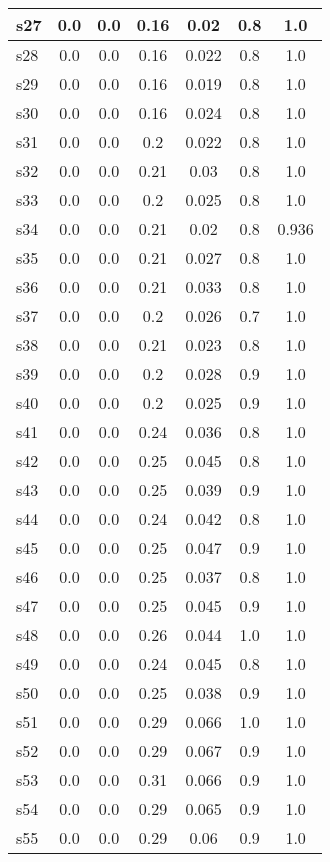 \documentclass{article}
\begin{document}
\begin{tabular}{|l|c|c|c|c|c|c|}
\hline
s27 &0.0 & 0.0 & 0.16 & 0.02 & 0.8 & 1.0\\
\hline
s28 &0.0 & 0.0 & 0.16 & 0.022 & 0.8 & 1.0\\
\hline
s29 &0.0 & 0.0 & 0.16 & 0.019 & 0.8 & 1.0\\
\hline
s30 &0.0 & 0.0 & 0.16 & 0.024 & 0.8 & 1.0\\
\hline
s31 &0.0 & 0.0 & 0.2 & 0.022 & 0.8 & 1.0\\
\hline
s32 &0.0 & 0.0 & 0.21 & 0.03 & 0.8 & 1.0\\
\hline
s33 &0.0 & 0.0 & 0.2 & 0.025 & 0.8 & 1.0\\
\hline
s34 &0.0 & 0.0 & 0.21 & 0.02 & 0.8 & 0.936\\
\hline
s35 &0.0 & 0.0 & 0.21 & 0.027 & 0.8 & 1.0\\
\hline
s36 &0.0 & 0.0 & 0.21 & 0.033 & 0.8 & 1.0\\
\hline
s37 &0.0 & 0.0 & 0.2 & 0.026 & 0.7 & 1.0\\
\hline
s38 &0.0 & 0.0 & 0.21 & 0.023 & 0.8 & 1.0\\
\hline
s39 &0.0 & 0.0 & 0.2 & 0.028 & 0.9 & 1.0\\
\hline
s40 &0.0 & 0.0 & 0.2 & 0.025 & 0.9 & 1.0\\
\hline
s41 &0.0 & 0.0 & 0.24 & 0.036 & 0.8 & 1.0\\
\hline
s42 &0.0 & 0.0 & 0.25 & 0.045 & 0.8 & 1.0\\
\hline
s43 &0.0 & 0.0 & 0.25 & 0.039 & 0.9 & 1.0\\
\hline
s44 &0.0 & 0.0 & 0.24 & 0.042 & 0.8 & 1.0\\
\hline
s45 &0.0 & 0.0 & 0.25 & 0.047 & 0.9 & 1.0\\
\hline
s46 &0.0 & 0.0 & 0.25 & 0.037 & 0.8 & 1.0\\
\hline
s47 &0.0 & 0.0 & 0.25 & 0.045 & 0.9 & 1.0\\
\hline
s48 &0.0 & 0.0 & 0.26 & 0.044 & 1.0 & 1.0\\
\hline
s49 &0.0 & 0.0 & 0.24 & 0.045 & 0.8 & 1.0\\
\hline
s50 &0.0 & 0.0 & 0.25 & 0.038 & 0.9 & 1.0\\
\hline
s51 &0.0 & 0.0 & 0.29 & 0.066 & 1.0 & 1.0\\
\hline
s52 &0.0 & 0.0 & 0.29 & 0.067 & 0.9 & 1.0\\
\hline
s53 &0.0 & 0.0 & 0.31 & 0.066 & 0.9 & 1.0\\
\hline
s54 &0.0 & 0.0 & 0.29 & 0.065 & 0.9 & 1.0\\
\hline
s55 &0.0 & 0.0 & 0.29 & 0.06 & 0.9 & 1.0\\

\end{tabular}
\end{document}
